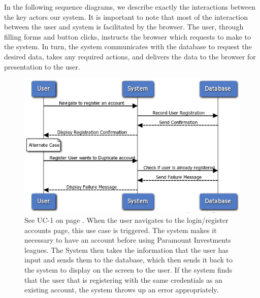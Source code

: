 In the following sequence diagrams, we describe exactly the interactions between the key
actors our system. It is important to note that most of the interaction between the
user and system is facilitated by the browser. The user, through filling forms and button
clicks, instructs the browser which requests to make to the system.
In turn, the system communicates with the database to request the desired data,
takes any required actions, and delivers the data to the browser for presentation to the user. \\

\begin{figure}
\centering
\includegraphics[width=5.5in]{./img/uc1.png}
\caption{See UC-1 on page \pageref{UC-1}. When the user navigates to the login/register accounts
page, this use case
is triggered. The system makes it necessary to have an account before using
Paramount Investments leagues. The System then takes the information that the
user has input and sends them to the database, which then sends it back to the
system to display on the screen to the user. If the system finds that the user that is
registering with the same credentials as an existing account, the system throws up
an error appropriately.}
\end{figure}

